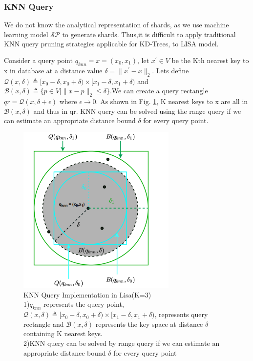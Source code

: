 \subsubsection{KNN Query}
We do not know the analytical representation of shards, as we use machine learning model $ \mathcal{SP}$ to generate shards. Thus,it is difficult to apply traditional KNN query pruning strategies applicable for KD-Trees, to LISA model. 

Consider a query point $q_{knn}=x=(x_{0},x_{1})$, let $x^{'} \in V$ be the Kth nearest key to x in database at a distance value $\delta = \| x^{'}-x\|_{2} $. Lets define $ \mathcal{Q}(x,\delta) \triangleq [x_{0}-\delta, x_{0}+\delta) \times[x_{1}-\delta, x_{1}+\delta)$ and $\mathcal{B}(x, \delta)  \triangleq \{p \in V \mid \| x-p\|_{2} \leq \delta \} $.We can create a query rectangle $qr =  \mathcal{Q}(x, \delta + \epsilon)$ where $\epsilon \rightarrow 0$. As shown in Fig. \ref{fig:KNN_Query_Lisa}, K nearest keys to x are all in $\mathcal{B}(x, \delta)$ and thus in qr. KNN query can be solved using the range query if we can estimate an appropriate distance bound $\delta$ for every query point.

\begin{figure}[t]
    \centering
    \includegraphics[width=0.7\textwidth]{graphs/KNN_Query_Lisa.png}
    \caption{KNN Query Implementation in Lisa(K=3)\\
    1)$q_{knn}$ represents the query point, $ \mathcal{Q}(x,\delta) \triangleq [x_{0}-\delta, x_{0}+\delta) \times[x_{1}-\delta, x_{1}+\delta)$, represents query rectangle and $ \mathcal{B}(x, \delta)$ represents the key space at distance $\delta$ containing K nearest keys.\\
    2)KNN query can be solved by range query if we can estimate an appropriate distance bound $\delta$ for every query point\\
    }
    \label{fig:KNN_Query_Lisa}
\end{figure}








